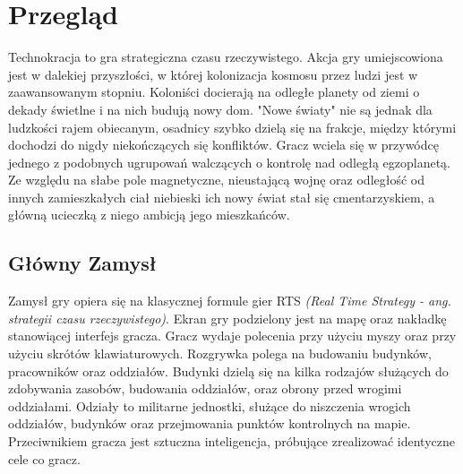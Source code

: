 \documentclass[a4paper]{scrreprt}
\title{\GameTiTle{}}
\subtitle{}
\author{Laura Stasiulewicz}
\def \GameTiTle{Technokracja}
\begin{document}
\maketitle

\begin{abstract}
\GameTiTle{} to gra strategiczna czasu rzeczywistego. Celem gracza jest pokonanie komputerowego przeciwnika w walce o kontrolę nad punktem dominacji na mapie. Aby to uczynić, musi wykorzystać zdolność planowania, zarządzania zarówno jednostkami, jak i zasobami oraz wiedzy na temat dostępnych rodzajów oddziałów jakie może przywołać i interakcji między nimi.  %

\end{abstract}

{
  \hypersetup{linkcolor=black}
  \tableofcontents
}

\chapter{Przegląd}
\GameTiTle{} to gra strategiczna czasu rzeczywistego. Akcja gry umiejscowiona jest w dalekiej przyszłości, w której kolonizacja kosmosu przez ludzi jest w zaawansowanym stopniu. Koloniści docierają na odległe planety od ziemi o dekady świetlne i na nich budują nowy dom. "Nowe światy" nie są jednak dla ludzkości rajem obiecanym, osadnicy szybko dzielą się na frakcje, między którymi dochodzi do nigdy niekończących się konfliktów. Gracz wciela się w przywódcę jednego z podobnych ugrupowań walczących o kontrolę nad odległą egzoplanetą. Ze względu na słabe pole magnetyczne, nieustającą wojnę oraz odległość od innych zamieszkałych ciał niebieski ich nowy świat stał się cmentarzyskiem, a główną ucieczką z niego ambicją jego mieszkańców.
\section{Główny Zamysł}
Zamysł gry opiera się na klasycznej formule gier RTS \emph{(Real Time Strategy - ang. strategii czasu rzeczywistego)}. Ekran gry podzielony jest na mapę oraz nakładkę stanowiącej interfejs gracza. Gracz wydaje polecenia przy użyciu myszy oraz przy użyciu skrótów klawiaturowych. Rozgrywka polega na budowaniu budynków, pracowników oraz oddziałów. Budynki dzielą się na kilka rodzajów służących do zdobywania zasobów, budowania oddziałów, oraz obrony przed wrogimi oddziałami. Odziały to militarne jednostki, służące do niszczenia wrogich oddziałów, budynków oraz przejmowania punktów kontrolnych na mapie. Przeciwnikiem gracza jest sztuczna inteligencja, próbujące zrealizować identyczne cele co gracz.
\end{document}
